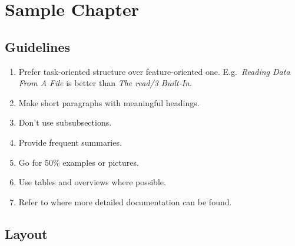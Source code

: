 %
% 
% 
% 
% 

\chapter{Sample Chapter}

\section{Guidelines}

\begin{enumerate}
\item Prefer task-oriented structure over feature-oriented one.
	E.g.\ {\em Reading Data From A File} is better than
	{\em The read/3 Built-In}.
\item Make short paragraphs with meaningful headings.
\item Don't use subsubsections.
\item Provide frequent summaries.
\item Go for 50\% examples or pictures.
\item Use tables and overviews where possible.
\item Refer to where more detailed documentation can be found.
\end{enumerate}

\section{Layout}

